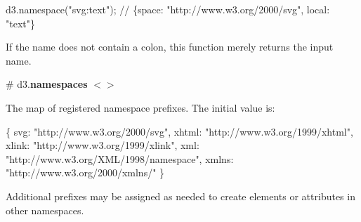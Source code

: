 \begin{DoxyCode}
d3.namespace("svg:text"); // \{space: "http://www.w3.org/2000/svg", local: "text"\}
\end{DoxyCode}


If the name does not contain a colon, this function merely returns the input name.

\label{_namespaces}%
\# d3.{\bfseries namespaces} \href{https://github.com/d3/d3-selection/blob/master/src/namespaces.js}{\tt $<$$>$}

The map of registered namespace prefixes. The initial value is\+:


\begin{DoxyCode}
\{
  svg: "http://www.w3.org/2000/svg",
  xhtml: "http://www.w3.org/1999/xhtml",
  xlink: "http://www.w3.org/1999/xlink",
  xml: "http://www.w3.org/XML/1998/namespace",
  xmlns: "http://www.w3.org/2000/xmlns/"
\}
\end{DoxyCode}


Additional prefixes may be assigned as needed to create elements or attributes in other namespaces. 
